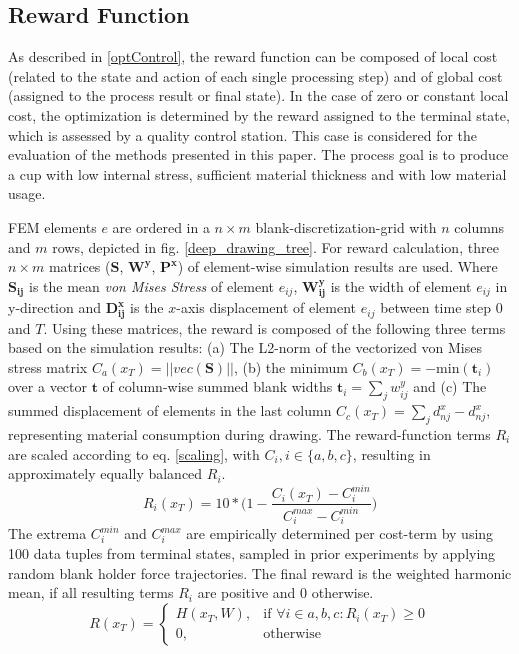 \subsection{Reward Function}
\label{reward}
As described in \ref{optControl}, the reward function can be composed of local cost (related to the state and action of each single processing step) and of global cost (assigned to the process result or final state). In the case of zero or constant local cost, the optimization is determined by the reward assigned to the terminal state, which is assessed by a quality control station. This case is considered for the evaluation of the methods presented in this paper. The process goal is to produce a cup with low internal stress, sufficient material thickness and with low material usage. 

FEM elements $e$ are ordered in a $n\times m$ blank-discretization-grid with $n$ columns and $m$ rows, depicted in fig. \ref{deep_drawing_tree}. For reward calculation, three $n\times m$ matrices ($\bm{S}$, $\bm{W^y}$, $\bm{P^x}$) of element-wise simulation results are used. Where $\bm{S_{ij}}$ is the mean \textit{von Mises Stress} of element $e_{ij}$, $\bm{W^y_{ij}}$ is the width of element $e_{ij}$ in y-direction and $\bm{D^x_{ij}}$ is the $x$-axis displacement of element $e_{ij}$ between time step $0$ and $T$. Using these matrices, the reward is composed of the following three terms based on the simulation results: (a) The L2-norm of the vectorized von Mises stress matrix $C_a(x_T)=||vec(\bm{S})||$, (b) the minimum $C_b(x_T)=-\mathrm{min}(\bm{t}_i)$ over a vector $\bm{t}$ of column-wise summed blank widths $\bm{t}_i=\sum_jw^y_{ij}$ and (c) The summed displacement of elements in the last column $C_c(x_T)=\sum_j{d^x_{nj} - d^x_{nj}}$, representing material consumption during drawing. The reward-function terms $R_i$ are scaled according to eq. \ref{scaling}, with $C_i, i\in \{a, b, c\}$, resulting in approximately equally balanced $R_i$.
\begin{equation}
\label{scaling}
R_i(x_T)=10*\bigg(1-\frac{C_i(x_T)-C_i^{min}}{C_i^{max}-C_i^{min}}\bigg)
\end{equation}
The extrema $C_i^{min}$ and $C_i^{max}$ are empirically determined per cost-term by using 100 data tuples from terminal states, sampled in prior experiments by applying random blank holder force trajectories. The final reward is the weighted harmonic mean, if all resulting terms $R_i$ are positive and 0 otherwise. 
\begin{equation}
\label{rewardFormula}
R(x_T)=
	\begin{cases}
	H(x_T, W), & \text{if }\forall i\in{a,b,c}: R_i(x_T)\geq 0\\
	0,																		& \text{otherwise}
	\end{cases}
\end{equation}
